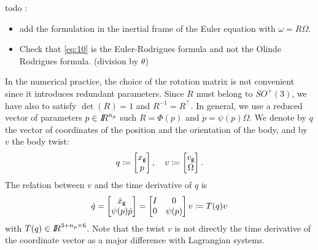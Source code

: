 \begin{ndrva}
  todo :
  \begin{itemize}
  \item add the formulation in the inertial frame of the Euler
    equation with $\omega =R \Omega$.
  \item Check that \eqref{eq:10} is the Euler-Rodrigues formula and not the Olinde Rodrigues formula. (division by $\theta$)
\end{itemize}

\end{ndrva}

In the numerical practice, the choice of the rotation matrix is not convenient since it introduces redundant parameters. Since $R$ must belong to $SO^+(3)$, we have also to satisfy $\det(R)=1$ and $R^{-1}=R^\top$. In general, we use a reduced vector of parameters $p\in\mbox{\rm $I\!\!R$}^{n_p}$ such $R = \Phi(p)$ and $\dot p = \psi(p)\Omega $. We denote  by $q$ the vector of coordinates of the position and the orientation of the body, and by $v$ {the body twist}:
\begin{equation}
  q \coloneqq \begin{bmatrix}
    x_{\sf \small g}\\
    p
  \end{bmatrix},\quad 
  v \coloneqq \begin{bmatrix}
     v_{\sf \small g}\\
     \Omega
   \end{bmatrix}.
 \end{equation}
 The relation between $v$ and the time derivative of $q$ is
\begin{equation}
  \label{eq:TT}
  \dot q = 
  \begin{bmatrix}
     \dot x_{\sf \small g}\\
     \psi(p) \dot p
   \end{bmatrix}
   = 
   \begin{bmatrix}
     I & 0 \\
     0 & \psi(p)
   \end{bmatrix}
   v
   \coloneqq
   T(q) v
\end{equation}
with $T(q) \in \mbox{\rm $I\!\!R$}^{{3+n_p}\times 6}$.
{Note that the twist $v$ is not directly the time derivative of the coordinate vector as a major difference with Lagrangian systems. }

